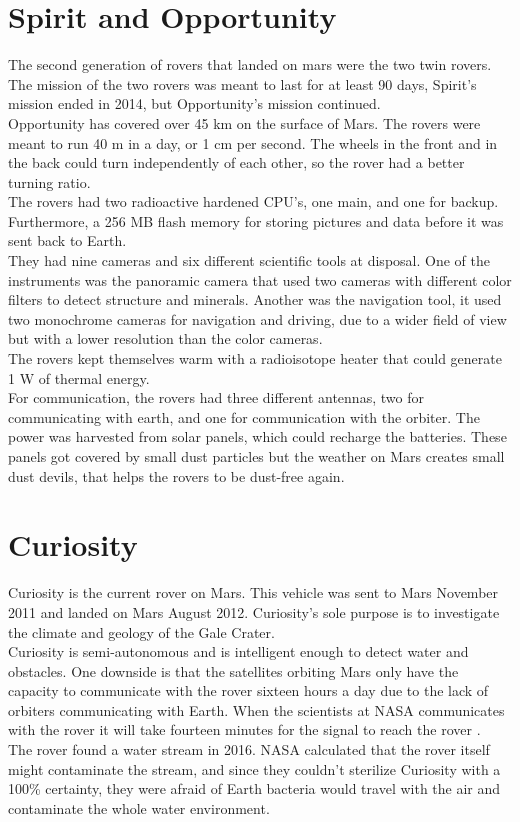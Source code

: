 \section{Spirit and Opportunity} \label{ch:existingSolutions_SpiritOpportunity} 
The second generation of rovers that landed on mars were the two twin rovers. The mission of the two rovers was meant to last for at least 90 days, Spirit’s mission ended in 2014, but Opportunity's mission continued.\\ Opportunity has covered over 45 km on the surface of Mars. The rovers were meant to run 40 m in a day, or 1 cm per second. The wheels in the front and in the back could turn independently of each other, so the rover had a better turning ratio.\\
The rovers had two radioactive hardened CPU's, one main, and one for backup. Furthermore, a 256 MB flash memory for storing pictures and data before it was sent back to Earth\cite{spiritopportunity_overview}.\\ They had nine cameras and six different scientific tools at disposal. One of the instruments was the panoramic camera that used two cameras with different color filters to detect structure and minerals. Another was the navigation tool, it used two monochrome cameras for navigation and driving, due to a wider field of view but with a lower resolution than the color cameras.\\The rovers kept themselves warm with a radioisotope heater that could generate 1 W of thermal energy.\\ For communication, the rovers had three different antennas, two for communicating with earth, and one for communication with the orbiter. The power was harvested from solar panels, which could recharge the batteries. These panels got covered by small dust particles but the weather on Mars creates small dust devils, that helps the rovers to be dust-free again\cite{Marsdust}.

\section{Curiosity}
\label{ch:existingSolutions_Curiosity}
Curiosity is the current rover on Mars. This vehicle was sent to Mars November 2011 and landed on Mars August 2012. Curiosity's sole purpose is to investigate the climate and geology of the Gale Crater\cite{CuriosityMissions}.\\ Curiosity is semi-autonomous and is intelligent enough to detect water and obstacles. One downside is that the satellites orbiting Mars only have the capacity to communicate with the rover sixteen hours a day due to the lack of orbiters communicating with Earth. When the scientists at NASA communicates with the rover it will take fourteen minutes for the signal to reach the rover\cite{CuriosityCommunication} \cite{CuriosityNASA}.\\
The rover found a water stream in 2016. NASA calculated that the rover itself might contaminate the stream, and since they couldn't sterilize Curiosity with a 100\% certainty, they were afraid of Earth bacteria would travel with the air and contaminate the whole water environment\cite{Curiosity2016}.


